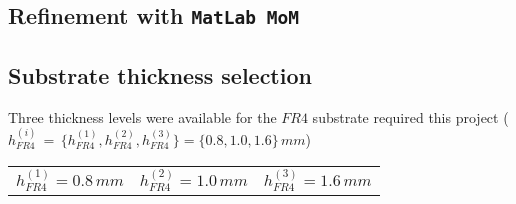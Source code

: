 \documentclass[12pt,a4paper]{article}
\begin{document}
{\subsection*{Refinement with \texttt{\color{BurntOrange}MatLab MoM}}
\subsection*{Substrate thickness selection}Three thickness levels were available for the $FR4$ substrate required this project ($h_{FR4}^{(i)}\,=\,\{h_{FR4}^{(1)},h_{FR4}^{(2)},h_{FR4}^{(3)}\}=\{0.8,1.0,1.6\}\,mm$)
	\begin{table}[h]
	\begin{center}
		{\selectfont
			\begin{tabular}{||m{3cm}|m{3cm}|m{3cm}||}
				\hline 
				\rowcolor{lightgray}\multicolumn{3}{|c|}{\textbf{FR4 substrate project thickness levels available}} 
				\\
				\hline
				\cellcolor{pink}$h_{FR4}^{(1)}=0.8\,mm$ & 
					\cellcolor{pink}$h_{FR4}^{(2)}=1.0\,mm$ & 
						\cellcolor{pink}$h_{FR4}^{(3)}=1.6\,mm$  \\
				\hline
				

\end{tabular}}
\end{center}
\end{table}}
\end{document}
